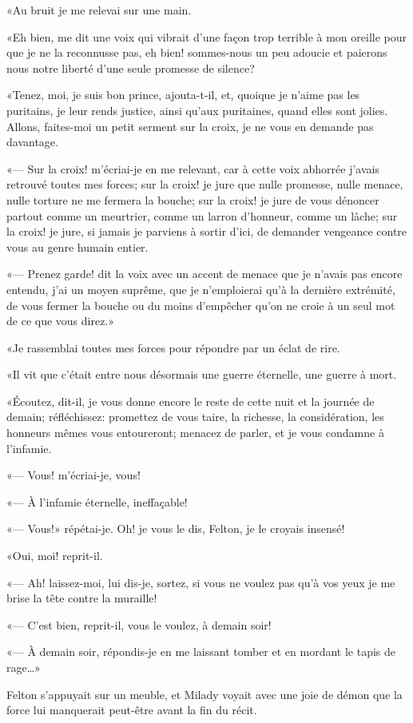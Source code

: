 «Au bruit je me relevai sur une main. 

«Eh bien, me dit une voix qui vibrait d'une façon trop terrible à mon oreille pour que je ne la reconnusse pas, eh bien! sommes-nous un peu adoucie et paierons nous notre liberté d'une seule promesse de silence? 

«Tenez, moi, je suis bon prince, ajouta-t-il, et, quoique je n'aime pas les puritains, je leur rends justice, ainsi qu'aux puritaines, quand elles sont jolies. Allons, faites-moi un petit serment sur la croix, je ne vous en demande pas davantage. 

«--- Sur la croix! m'écriai-je en me relevant, car à cette voix abhorrée j'avais retrouvé toutes mes forces; sur la croix! je jure que nulle promesse, nulle menace, nulle torture ne me fermera la bouche; sur la croix! je jure de vous dénoncer partout comme un meurtrier, comme un larron d'honneur, comme un lâche; sur la croix! je jure, si jamais je parviens à sortir d'ici, de demander vengeance contre vous au genre humain entier. 

«--- Prenez garde! dit la voix avec un accent de menace que je n'avais pas encore entendu, j'ai un moyen suprême, que je n'emploierai qu'à la dernière extrémité, de vous fermer la bouche ou du moins d'empêcher qu'on ne croie à un seul mot de ce que vous direz.» 

«Je rassemblai toutes mes forces pour répondre par un éclat de rire. 

«Il vit que c'était entre nous désormais une guerre éternelle, une guerre à mort. 

«Écoutez, dit-il, je vous donne encore le reste de cette nuit et la journée de demain; réfléchissez: promettez de vous taire, la richesse, la considération, les honneurs mêmes vous entoureront; menacez de parler, et je vous condamne à l'infamie. 

«--- Vous! m'écriai-je, vous! 

«--- À l'infamie éternelle, ineffaçable! 

«--- Vous!» répétai-je. Oh! je vous le dis, Felton, je le croyais insensé! 

«Oui, moi! reprit-il. 

«--- Ah! laissez-moi, lui dis-je, sortez, si vous ne voulez pas qu'à vos yeux je me brise la tête contre la muraille! 

«--- C'est bien, reprit-il, vous le voulez, à demain soir! 

«--- À demain soir, répondis-je en me laissant tomber et en mordant le tapis de rage\dots» 

Felton s'appuyait sur un meuble, et Milady voyait avec une joie de démon que la force lui manquerait peut-être avant la fin du récit. 